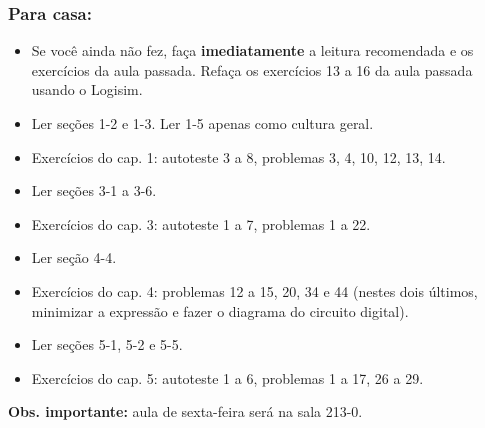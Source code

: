 \documentclass{beamer}
\begin{document}

\begin{frame}
\frametitle{Para casa:}

\begin{itemize}
\item Se você ainda não fez, faça \textbf{imediatamente} a leitura
recomendada e os exercícios da aula passada.
Refaça os exercícios 13 a 16 da aula passada usando o Logisim.
\item Ler seções 1-2 e 1-3. Ler 1-5 apenas como cultura geral.
\item Exercícios do cap. 1: autoteste 3 a 8, problemas 3, 4, 10, 12, 13, 14.
\item Ler seções 3-1 a 3-6.
\item Exercícios do cap. 3: autoteste 1 a 7, problemas 1 a 22.
\item Ler seção 4-4.
\item Exercícios do cap. 4: problemas 12 a 15, 20, 34 e 44 (nestes dois
últimos, minimizar a expressão e fazer o diagrama do circuito digital).
\item Ler seções 5-1, 5-2 e 5-5.
\item Exercícios do cap. 5: autoteste 1 a 6, problemas 1 a 17, 26 a 29.
\end{itemize}

\textbf{Obs. importante: } aula de sexta-feira será na sala 213-0.
\end{frame}
\end{document}
